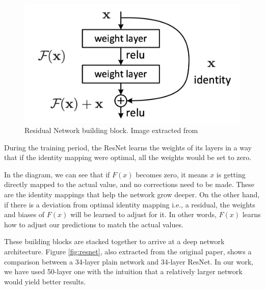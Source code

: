 \begin{figure}[h!tp]
    \centering
    \includegraphics[width=.5\textwidth]{imgs/chap5_building_block.png}
    \caption[Residual Network building block.]{Residual Network building block. Image extracted from \cite{ParkhiVZ15}}
    \label{fig:building_block}
\end{figure}

During the training period, the ResNet learns the weights of its layers in a way that if the identity mapping were optimal, all the weights would be set to zero.

In the diagram, we can see that if $F(x)$ becomes zero, it means $x$ is getting directly mapped to the actual value, and no corrections need to be made. These are the identity mappings that help the network grow deeper. On the other hand, if there is a deviation from optimal identity mapping i.e., a residual, the weights and biases of $F(x)$ will be learned to adjust for it. In other words, $F(x)$ learns how to adjust our predictions to match the actual values.

These building blocks are stacked together to arrive at a deep network architecture. Figure \ref{fig:resnet}, also extracted from the original paper, shows a comparison between a 34-layer plain network and 34-layer ResNet. In our work, we have used 50-layer one with the intuition that a relatively larger network would yield better results.

